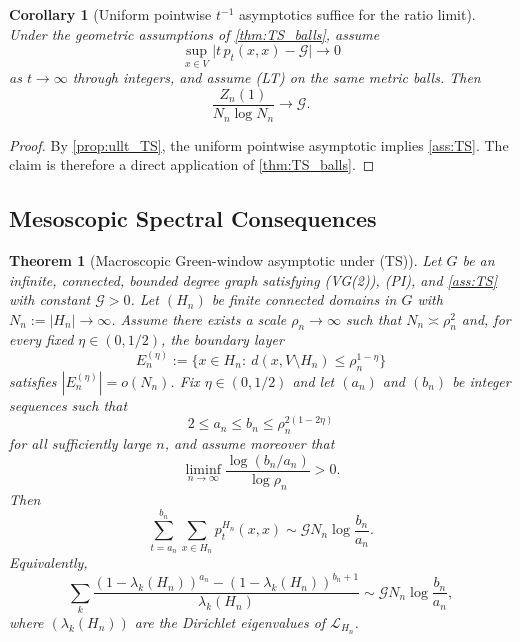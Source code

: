 \documentclass[reqno]{amsart}
\numberwithin{equation}{section}
\newtheorem{theorem}{Theorem}[section]
\newtheorem{corollary}[corollary]{Corollary}
\theoremstyle{definition}
\theoremstyle{remark}
\newcommand{\Cref}[1]{\autoref{#1}}
\newcommand{\cG}{\mathcal{G}}
\newcommand{\LL}{\mathcal{L}}
\begin{document}
\begin{corollary}[Uniform pointwise $t^{-1}$ asymptotics suffice for the ratio limit]\label{cor:ullt_ratio}
Under the geometric assumptions of \Cref{thm:TS_balls}, assume
\[
  \sup_{x\in V}\bigl|t\,p_t(x,x)-\cG\bigr|\longrightarrow 0
\]
as $t\to\infty$ through integers, and assume \textup{(LT)} on the same metric balls. Then
\[
  \frac{Z_n(1)}{N_n\log N_n}\longrightarrow \cG.
\]
\end{corollary}

\begin{proof}
By \Cref{prop:ullt_TS}, the uniform pointwise asymptotic implies \Cref{ass:TS}. The claim is therefore a direct application of \Cref{thm:TS_balls}.
\end{proof}

\subsection{Mesoscopic Spectral Consequences}

\begin{theorem}[Macroscopic Green-window asymptotic under \textup{(TS)}]\label{thm:TS_window}
Let $G$ be an infinite, connected, bounded degree graph satisfying \textup{(VG(2))}, \textup{(PI)}, and \Cref{ass:TS} with constant $\cG>0$. Let $(H_n)$ be finite connected domains in $G$ with $N_n:=|H_n|\to\infty$. Assume there exists a scale $\rho_n\to\infty$ such that $N_n\asymp \rho_n^2$ and, for every fixed $\eta\in(0,1/2)$, the boundary layer
\[
  E_n^{(\eta)}:=\{x\in H_n:\ d(x,V\setminus H_n)\le \rho_n^{1-\eta}\}
\]
satisfies $|E_n^{(\eta)}|=o(N_n)$. Fix $\eta\in(0,1/2)$ and let $(a_n)$ and $(b_n)$ be integer sequences such that
\[
  2\le a_n\le b_n\le \rho_n^{2(1-2\eta)}
\]
for all sufficiently large $n$, and assume moreover that
\[
  \liminf_{n\to\infty}\frac{\log(b_n/a_n)}{\log \rho_n}>0.
\]
Then
\[
  \sum_{t=a_n}^{b_n}\sum_{x\in H_n} p_t^{H_n}(x,x)
  \sim
  \cG N_n\log\frac{b_n}{a_n}.
\]
Equivalently,
\[
  \sum_k
  \frac{(1-\lambda_k(H_n))^{a_n}-(1-\lambda_k(H_n))^{b_n+1}}
       {\lambda_k(H_n)}
  \sim
  \cG N_n\log\frac{b_n}{a_n},
\]
where $(\lambda_k(H_n))$ are the Dirichlet eigenvalues of $\LL_{H_n}$.
\end{theorem}
\end{document}
